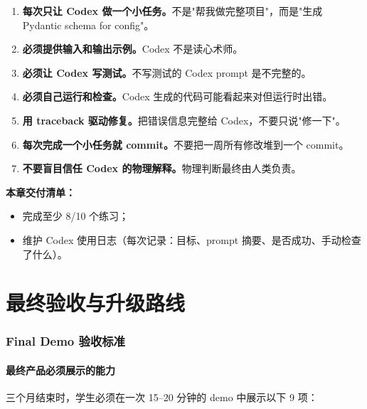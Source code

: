\documentclass[11pt,a4paper,fontset=fandol]{ctexart}
\begin{document}
\begin{enumerate}
  \item \textbf{每次只让 Codex 做一个小任务。}不是"帮我做完整项目"，而是"生成 Pydantic schema for config"。
  \item \textbf{必须提供输入和输出示例。}Codex 不是读心术师。
  \item \textbf{必须让 Codex 写测试。}不写测试的 Codex prompt 是不完整的。
  \item \textbf{必须自己运行和检查。}Codex 生成的代码可能看起来对但运行时出错。
  \item \textbf{用 traceback 驱动修复。}把错误信息完整给 Codex，不要只说"修一下"。
  \item \textbf{每次完成一个小任务就 commit。}不要把一周所有修改堆到一个 commit。
  \item \textbf{不要盲目信任 Codex 的物理解释。}物理判断最终由人类负责。
\end{enumerate}

\textbf{本章交付清单：}
\begin{itemize}
  \item 完成至少 8/10 个练习；
  \item 维护 Codex 使用日志（每次记录：目标、prompt 摘要、是否成功、手动检查了什么）。
\end{itemize}

\newpage

\part{最终验收与升级路线}

\section{Final Demo 验收标准}

\subsection{最终产品必须展示的能力}

三个月结束时，学生必须在一次 15--20 分钟的 demo 中展示以下 9 项：
\end{document}
